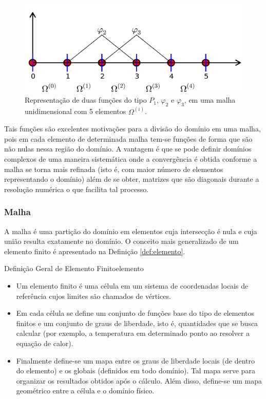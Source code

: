   \begin{figure}[ht]
	\centering
	\includegraphics[width=\linewidth]{./figures/P1_fun.pdf}
	\caption{Representação de duas funções do tipo $P_1$, $\varphi_2$ e
    $\varphi_3$, em uma malha unidimensional com 5 elementos $\Omega^{(i)} $.  \label{fig:P1fun}}
  \end{figure}

  Tais funções são excelentes motivações para a divisão do domínio em uma malha,
  pois em cada elemento de determinada malha tem-se funções de forma que são não
  nulas nessa região do domínio. A vantagem é que se pode definir domínios
  complexos de uma maneira sistemática onde a convergência é obtida conforme a
  malha se torna mais refinada (isto é, com maior número de elementos
  representando o domínio) além de se obter, matrizes que são
  diagonais durante a resolução numérica o que facilita tal processo.


    \subsubsection{Malha}
    	A malha é uma partição do domínio em elementos cuja intersecção é nula e cuja união resulta exatamente no domínio. O conceito mais generalizado de um elemento finito é apresentado na Definição \ref{def:elemento}.

    \begin{Definition}{Definição Geral de Elemento Finito}{elemento}
      \begin{itemize}
        \item Um elemento finito é uma célula em um sistema de coordenadas
      locais de referência cujos limites são chamados de vértices.

        \item Em cada célula se define um conjunto de funções base do tipo de elementos
      finitos e um conjunto de graus de liberdade, isto é, quantidades que se
      busca calcular (por exemplo, a temperatura em determinado ponto ao resolver
      a equação de calor).
     
        \item Finalmente define-se um mapa entre os graus de liberdade locais (de dentro
      do elemento) e os globais (definidos em todo domínio). Tal mapa serve para
      organizar os resultados obtidos após o cálculo. Além disso, define-se um
      mapa geométrico entre a célula e o domínio físico.
      \end{itemize}
      \end{Definition}

